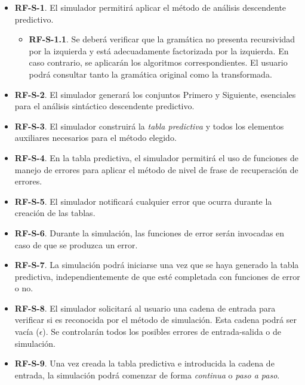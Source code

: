 \begin{itemize}
    \item \textbf{RF-S-1}. El simulador permitirá aplicar el método de análisis descendente predictivo.
  \begin{itemize}
      \item \textbf{RF-S-1.1}. Se deberá verificar que la gramática no presenta recursividad por la izquierda y está adecuadamente factorizada por la izquierda. En caso contrario, se aplicarán los algoritmos correspondientes. El usuario podrá consultar tanto la gramática original como la transformada.
  \end{itemize}

    \item \textbf{RF-S-2}. El simulador generará los conjuntos Primero y Siguiente, esenciales para el análisis sintáctico descendente predictivo.

    \item \textbf{RF-S-3}. El simulador construirá la \textit{tabla predictiva} y todos los elementos auxiliares necesarios para el método elegido.

    \item \textbf{RF-S-4}. En la tabla predictiva, el simulador permitirá el uso de funciones de manejo de errores para aplicar el método de nivel de frase de recuperación de errores. 

    \item \textbf{RF-S-5}. El simulador notificará cualquier error que ocurra durante la creación de las tablas.

    \item \textbf{RF-S-6}. Durante la simulación, las funciones de error serán invocadas en caso de que se produzca un error.

    \item \textbf{RF-S-7}. La simulación podrá iniciarse una vez que se haya generado la tabla predictiva, independientemente de que esté completada con funciones de error o no.

    \item \textbf{RF-S-8}. El simulador solicitará al usuario una cadena de entrada para verificar si es reconocida por el método de simulación. Esta cadena podrá ser vacía ($\epsilon$). Se controlarán todos los posibles errores de entrada-salida o de simulación.

    \item \textbf{RF-S-9}. Una vez creada la tabla predictiva e introducida la cadena de entrada, la simulación podrá comenzar de forma \textit{continua} o \textit{paso a paso}.


\end{itemize}
